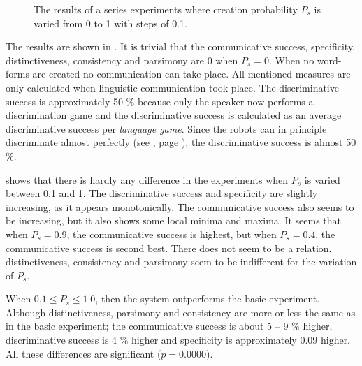 \begin{figure}
\caption{The results of a series experiments where creation probability $P_s$ is varied from 0 to 1 with steps of 0.1.}
\label{f:lex:p}
\end{figure}

The results are shown in . It is trivial that the communicative success, specificity, distinctiveness, consistency and parsimony are 0 when $P_s=0$. When no word-forms are created no communication can take place. All mentioned measures are only calculated when linguistic communication took place. The discriminative success is approximately 50 \% because only the speaker now performs a discrimination game and the discriminative success is calculated as an average discriminative success per {\em language game}. Since the robots can in principle discriminate almost perfectly (see , page \pageref{f:st:ds}), the discriminative success is almost 50 \%. 

 shows that there is hardly any difference in the experiments when $P_s$ is varied between 0.1 and 1. The discriminative success and specificity are slightly increasing, as it appears monotonically. The communicative success also seems to be increasing, but it also shows some local minima and maxima. It seems that when $P_s=0.9$, the communicative success is highest, but when $P_s=0.4$, the communicative success is second best. There does not seem to be a relation. distinctiveness, consistency and parsimony seem to be indifferent for the variation of $P_s$.

When $0.1 \leq P_s \leq 1.0$, then the system outperforms the basic experiment. Although distinctiveness, parsimony and consistency are more or less the same as in the basic experiment; the communicative success is about 5 -- 9 \% higher, discriminative success is 4 \% higher and specificity is approximately 0.09 higher. All these differences are significant ($p=0.0000$).

